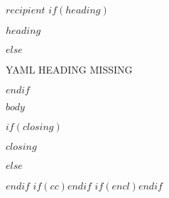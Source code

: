 \documentclass[$if(dept)$$dept$$else$iss$endif$,$if(english)$english$else$norsk$endif$]{xeuioletter2}
\begin{document}
\begin{letter}{$recipient$}
$if(heading)$\opening{$heading$}$else$\opening{YAML HEADING MISSING}$endif$

$body$

$if(closing)$\closing{$closing$}$else$\closing{}$endif$
$if(cc)$$endif$
$if(encl)$$endif$

\end{letter}
\end{document}
